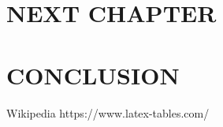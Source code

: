 \documentclass[12pt,a4paper]{report}
\begin{document}
\chapter{NEXT CHAPTER}

\chapter{CONCLUSION}




\begin{thebibliography}{99}
 Wikipedia
 https://www.latex-tables.com/
\end{thebibliography}
\end{document}
